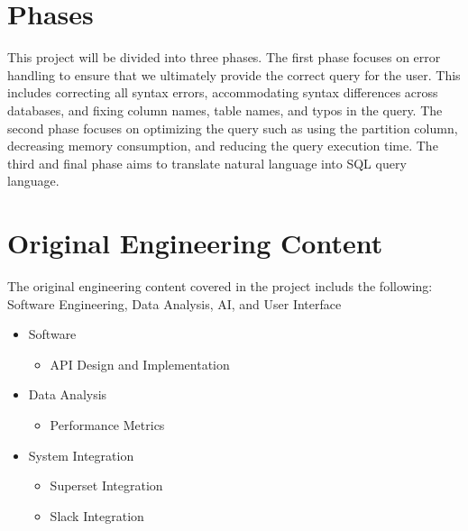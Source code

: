 \section{Phases}
This project will be divided into three phases. The first phase focuses on error handling to ensure that we ultimately provide the correct query for the user. This includes correcting all syntax errors, accommodating syntax differences across databases, and fixing column names, table names, and typos in the query. The second phase focuses on optimizing the query such as using the partition column, decreasing memory consumption, and reducing the query execution time. The third and final phase aims to translate natural language into SQL query language.


\section{Original Engineering Content}
The original engineering content covered in the project includs the following: Software Engineering, Data Analysis, AI, and User Interface 
    \begin{itemize}
        \item  Software
        \begin{itemize}
            \item API Design and Implementation
        \end{itemize}
        \item  Data Analysis
        \begin{itemize}
            \item Performance Metrics
        \end{itemize}
        \item  System Integration
        \begin{itemize}
            \item Superset Integration
            \item Slack Integration
        \end{itemize}
    \end{itemize}

\pagebreak
